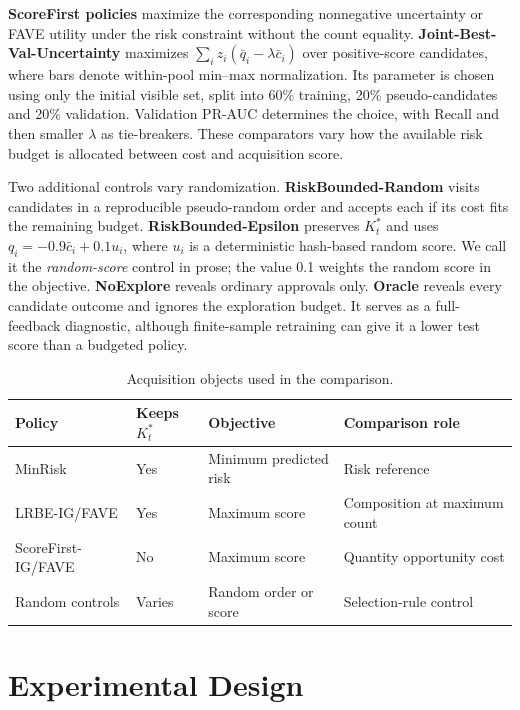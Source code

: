 \textbf{ScoreFirst policies} maximize the corresponding nonnegative uncertainty or FAVE utility under the risk constraint without the count equality. \textbf{Joint-Best-Val-Uncertainty} maximizes $\sum_i z_i(\bar q_i-\lambda\bar c_i)$ over positive-score candidates, where bars denote within-pool min--max normalization. Its parameter is chosen using only the initial visible set, split into 60\% training, 20\% pseudo-candidates and 20\% validation. Validation PR-AUC determines the choice, with Recall and then smaller $\lambda$ as tie-breakers. These comparators vary how the available risk budget is allocated between cost and acquisition score.

Two additional controls vary randomization. \textbf{RiskBounded-Random} visits candidates in a reproducible pseudo-random order and accepts each if its cost fits the remaining budget. \textbf{RiskBounded-Epsilon} preserves $K_t^*$ and uses $q_i=-0.9\bar c_i+0.1u_i$, where $u_i$ is a deterministic hash-based random score. We call it the \emph{random-score} control in prose; the value 0.1 weights the random score in the objective. \textbf{NoExplore} reveals ordinary approvals only. \textbf{Oracle} reveals every candidate outcome and ignores the exploration budget. It serves as a full-feedback diagnostic, although finite-sample retraining can give it a lower test score than a budgeted policy.

\begin{table}[t]
\caption{Acquisition objects used in the comparison.}
\label{tab:strategies}
\centering\scriptsize
\begin{tabular}{llll}
\toprule
Policy & Keeps $K_t^*$ & Objective & Comparison role\\
\midrule
MinRisk & Yes & Minimum predicted risk & Risk reference\\
LRBE-IG/FAVE & Yes & Maximum score & Composition at maximum count\\
ScoreFirst-IG/FAVE & No & Maximum score & Quantity opportunity cost\\
Random controls & Varies & Random order or score & Selection-rule control\\
\bottomrule
\end{tabular}
\end{table}

\section{Experimental Design}
\label{sec:experiments}
